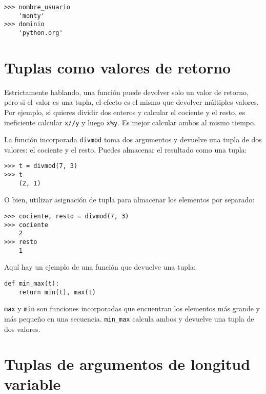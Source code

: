 \documentclass[10pt]{book}
\begin{document}
\begin{verbatim}
>>> nombre_usuario
    'monty'
>>> dominio
    'python.org'
\end{verbatim}
%

\section{Tuplas como valores de retorno}

Estrictamente hablando, una función puede devolver solo un valor de retorno, pero
si el valor es una tupla, el efecto es el mismo que devolver
múltiples valores.  Por ejemplo, si quieres dividir dos enteros
y calcular el cociente y el resto, es ineficiente
calcular {\tt x//y} y luego {\tt x\%y}.  Es mejor calcular
ambos al mismo tiempo.

La función incorporada {\tt divmod} toma dos argumentos y
devuelve una tupla de dos valores: el cociente y el resto.
Puedes almacenar el resultado como una tupla:

\begin{verbatim}
>>> t = divmod(7, 3)
>>> t
    (2, 1)
\end{verbatim}
%
O bien, utilizar asignación de tupla para almacenar los elementos por separado:

\begin{verbatim}
>>> cociente, resto = divmod(7, 3)
>>> cociente
    2
>>> resto
    1
\end{verbatim}
%
Aquí hay un ejemplo de una función que devuelve una tupla:

\begin{verbatim}
def min_max(t):
    return min(t), max(t)
\end{verbatim}
%
{\tt max} y {\tt min} son funciones incorporadas que encuentran
los elementos más grande y más pequeño en una secuencia.  \verb"min_max"
calcula ambos y devuelve una tupla de dos valores.


\section{Tuplas de argumentos de longitud variable}
\label{gather}
\end{document}
